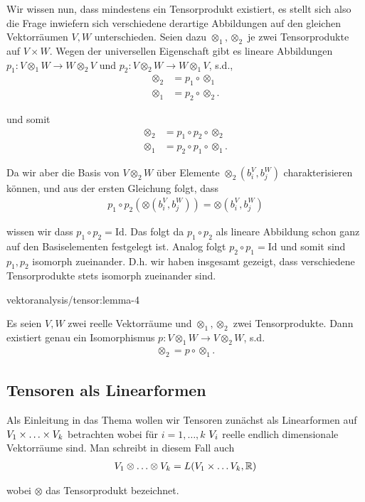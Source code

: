 \par
Wir wissen nun, dass mindestens ein Tensorprodukt existiert, es stellt sich also die Frage inwiefern sich verschiedene derartige Abbildungen auf den gleichen Vektorräumen \(V,W\) unterschieden. Seien dazu \(\otimes_1, \otimes_2\) je zwei Tensorprodukte auf \(V\times W\). Wegen der universellen Eigenschaft gibt es lineare Abbildungen \(p_1: V\otimes_1 W\to W\otimes_2 V\) und \(p_2: V\otimes_2 W\to W\otimes_1 V\), s.d.,
\begin{align*}
\otimes_2 &= p_1 \circ \otimes_1\\
\otimes_1 &= p_2 \circ \otimes_2.
\end{align*}
\par
und somit
\begin{align*}
\otimes_2 &= p_1\circ p_2 \circ \otimes_2\\
\otimes_1 &= p_2\circ p_1 \circ \otimes_1.
\end{align*}
\par
Da wir aber die Basis von \(V\otimes_2 W\) über Elemente \(\otimes_2(b_i^V, b_j^W)\) charakterisieren können, und aus der ersten Gleichung folgt, dass
\begin{align*}
p_1\circ p_2(\otimes(b_i^V,b_j^W)) = \otimes(b_i^V, b_j^W)
\end{align*}
\par
wissen wir dass \(p_1\circ p_2 = \mathrm{Id}\). Das folgt da \(p_1\circ p_2\) als lineare Abbildung schon ganz auf den Basiselementen festgelegt ist.
Analog folgt \(p_2\circ p_1 = \mathrm{Id}\) und somit sind \(p_1, p_2\) isomorph zueinander. D.h. wir haben insgesamt gezeigt, dass verschiedene Tensorprodukte stets isomorph zueinander sind.
\begin{lemma}{}{vektoranalysis/tensor:lemma-4}



\par
Es seien \(V,W\) zwei reelle Vektorräume und \(\otimes_1,\otimes_2\) zwei Tensorprodukte. Dann existiert genau ein Isomorphismus \(p:V\otimes_1 W\to V\otimes_2 W\), s.d.
\begin{align*}
\otimes_2 = p\circ \otimes_1.
\end{align*}\end{lemma}


\subsection{Tensoren als Linearformen}
\label{\detokenize{vektoranalysis/tensor:tensoren-als-linearformen}}
\par
Als Einleitung in das Thema wollen wir Tensoren zunächst als Linearformen auf \(V_1\times\ldots\times V_k\)
betrachten wobei für \(i=1,\ldots,k\) \(V_i\) reelle endlich dimensionale Vektorräume sind.
Man schreibt in diesem Fall auch
\begin{align*}
V_1\otimes\ldots\otimes V_k = L(V_1\times\ldots V_k,\mathbb{R})
\end{align*}
\par
wobei \(\otimes\) das Tensorprodukt bezeichnet.

